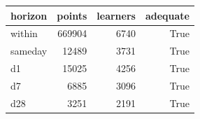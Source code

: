 \begin{tabular}{lrrr}
\toprule
horizon & points & learners & adequate \\
\midrule
within & 669904 & 6740 & True \\
sameday & 12489 & 3731 & True \\
d1 & 15025 & 4256 & True \\
d7 & 6885 & 3096 & True \\
d28 & 3251 & 2191 & True \\
\bottomrule
\end{tabular}
